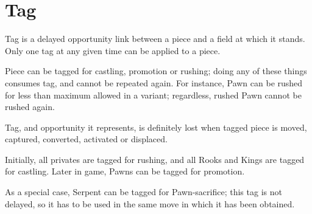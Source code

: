 \section*{Tag}
\label{sec:Terms/Tag}
Tag is a delayed opportunity link between a piece and a field at which it stands.
Only one tag at any given time can be applied to a piece.

Piece can be tagged for castling, promotion or rushing; doing any of these things
consumes tag, and cannot be repeated again. For instance, Pawn can be rushed for
less than maximum allowed in a variant; regardless, rushed Pawn cannot be rushed
again.

Tag, and opportunity it represents, is definitely lost when tagged piece is moved,
captured, converted, activated or displaced.

Initially, all privates are tagged for rushing, and all Rooks and Kings are tagged
for castling. Later in game, Pawns can be tagged for promotion.

As a special case, Serpent can be tagged for Pawn-sacrifice; this tag is not
delayed, so it has to be used in the same move in which it has been obtained.






\clearpage %
